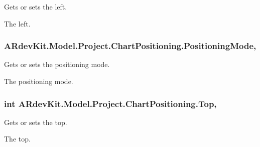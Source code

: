 Gets or sets the left. 

The left. \hypertarget{class_a_rdev_kit_1_1_model_1_1_project_1_1_chart_positioning_adae5996b4fe2ac69c164ab256037ec5f}{
\subsubsection[{Positioning\-Mode}]{ A\-Rdev\-Kit.\-Model.\-Project.\-Chart\-Positioning.\-Positioning\-Mode\hspace{0.3cm}{\ttfamily [get]}, {\ttfamily [set]}}}\label{class_a_rdev_kit_1_1_model_1_1_project_1_1_chart_positioning_adae5996b4fe2ac69c164ab256037ec5f}


Gets or sets the positioning mode. 

The positioning mode. \hypertarget{class_a_rdev_kit_1_1_model_1_1_project_1_1_chart_positioning_a0853d6ce2e37038ba62f051285ebf2ca}{
\subsubsection[{Top}]{\setlength{\rightskip}{0pt plus 5cm}int A\-Rdev\-Kit.\-Model.\-Project.\-Chart\-Positioning.\-Top\hspace{0.3cm}{\ttfamily [get]}, {\ttfamily [set]}}}\label{class_a_rdev_kit_1_1_model_1_1_project_1_1_chart_positioning_a0853d6ce2e37038ba62f051285ebf2ca}


Gets or sets the top. 

The top. 